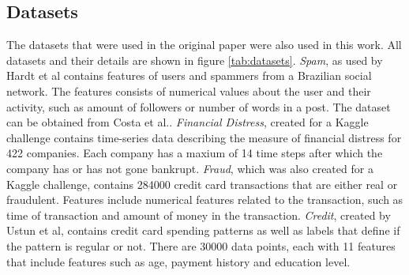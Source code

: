 \subsection{Datasets} \label{sec:datasets}
The datasets that were used in the original paper were also used in this work. All datasets and their details are shown in figure \ref{tab:datasets}. 
\textit{Spam}, as used by Hardt et al\cite{hardt2016strategic} contains features of users and spammers from a Brazilian social network. The features consists of numerical values about the user and their activity, such as amount of followers or number of words in a post. The dataset can be obtained from Costa et al.\cite{spam_data}.
\textit{Financial Distress}, created for a Kaggle challenge \cite{financial_distress} contains time-series data describing the measure of financial distress for 422 companies. Each company has a maxium of 14 time steps after which the company has or has not gone bankrupt.
\textit{Fraud}, which was also created for a Kaggle challenge\cite{credit_fraud}, contains 284000 credit card transactions that are either real or fraudulent. Features include numerical features related to the transaction, such as time of transaction and amount of money in the transaction.
\textit{Credit}, created by Ustun et al\cite{ustun2019actionable}, contains credit card spending patterns as well as labels that define if the pattern is regular or not. There are 30000 data points, each with 11 features that include features such as age, payment history and education level.
